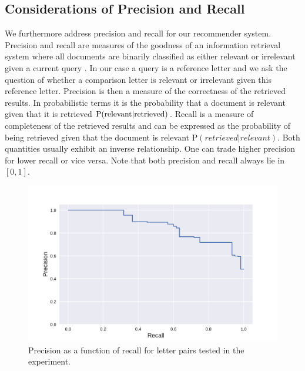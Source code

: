 \subsection*{Considerations of Precision and Recall}
We furthermore address precision and recall for our recommender system. Precision and recall are measures of the goodness of an information retrieval system where all documents are binarily classified as either relevant or irrelevant given a current query \citep{Manning2008prerec}. In our case a query is a reference letter and we ask the question of whether a comparison letter is relevant or irrelevant given this reference letter. Precision is then a measure of the correctness of the retrieved results. In probabilistic terms it is the probability that a document is relevant given that it is retrieved $\rm{P}(relevant|retrieved)$. Recall is a measure of completeness of the retrieved results and can be expressed as the probability of being retrieved given that the document is relevant P$(retrieved|relevant)$. Both quantities usually exhibit an inverse relationship. One can trade higher precision for lower recall or vice versa. Note that both precision and recall always lie in $[0,1]$.

\begin{figure}
	\centering
	\includegraphics[width=0.7\linewidth]{figures/precision_recall_curve}
	\caption{Precision as a function of recall for letter pairs tested in the experiment.}
	\label{fig:precision_recall_curve}
\end{figure}


